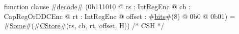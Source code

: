 function clause #\hyperref[zdecode]{decode}# (0b111010 @ rs : IntRegEnc @ cb : CapRegOrDDCEnc @ rt : IntRegEnc @ offset : #\hyperref[zbits]{bits}#(8) @ 0b0 @ 0b01) = #\hyperref[zSome]{Some}#(#\hyperref[zCStore]{CStore}#(rs, cb, rt, offset, H)) /* CSH */
